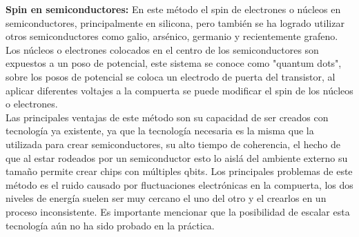 \textbf{Spin en semiconductores:} En este método el spin de electrones o núcleos en semiconductores, principalmente en silicona, pero también se ha logrado utilizar otros semiconductores como galio, arsénico, germanio y recientemente grafeno. Los núcleos o electrones colocados en el centro de los semiconductores son expuestos a un poso de potencial, este sistema se conoce como "quantum dots", sobre los posos de potencial se coloca un electrodo de puerta del transistor, al aplicar diferentes voltajes a la compuerta se puede modificar el spin de los núcleos o electrones.\\
Las principales ventajas de este método son su capacidad de ser creados con tecnología ya existente, ya que la tecnología necesaria es la misma que la utilizada para crear semiconductores, su alto tiempo de coherencia, el hecho de que al estar rodeados por un semiconductor esto lo aislá del ambiente externo su tamaño permite crear chips con múltiples qbits. Los principales problemas de este método es el ruido causado por fluctuaciones electrónicas en la compuerta, los dos niveles de energía suelen ser muy cercano el uno del otro y el crearlos en un proceso inconsistente. Es importante mencionar que la posibilidad de escalar esta tecnología aún no ha sido probado en la práctica.
